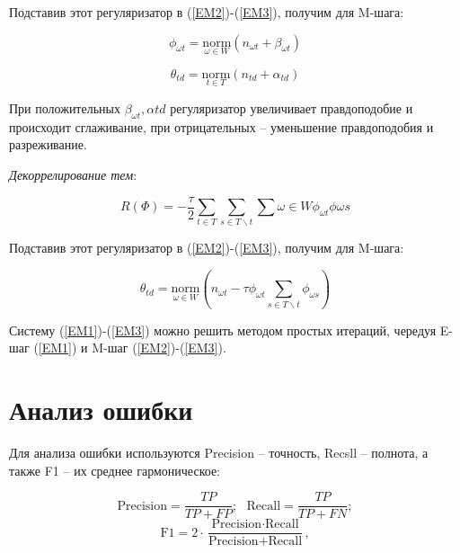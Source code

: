 \documentclass[a4paper, 12pt]{article}
\begin{document}
    Подставив этот регуляризатор в (\ref{EM2})-(\ref{EM3}), получим для M-шага:

    \begin{equation}
        \phi_{\omega t} = \underset{\omega \in W}{\text{norm}}(n_{\omega t} + \beta_{\omega t})
    \end{equation}

    \begin{equation}
        \theta_{td} = \underset{t \in T}{\text{norm}}(n_{td} + \alpha_{td})
    \end{equation}

    При положительных $\beta_{\omega t}, \alpha{td}$ регуляризатор увеличивает правдоподобие и происходит сглаживание, при отрицательных -- уменьшение правдоподобия и разреживание.

    \textit{Декоррелирование тем}:

    \begin{equation}
        R(\Phi) = -\frac{\tau}{2}\sum\limits_{t \in T}\sum\limits_{s \in T\backslash t}\sum\limits{\omega \in W}\phi_{\omega t}\phi{\omega s}
    \end{equation}

    Подставив этот регуляризатор в (\ref{EM2})-(\ref{EM3}), получим для M-шага:

    \begin{equation}
        \theta_{td} = \underset{\omega \in W}{\text{norm}}(n_{\omega t} - \tau \phi_{\omega t} \sum\limits_{s \in T\backslash t}\phi_{\omega s})
    \end{equation}

    Систему (\ref{EM1})-(\ref{EM3}) можно решить методом простых итераций, чередуя E-шаг (\ref{EM1}) и M-шаг (\ref{EM2})-(\ref{EM3}).

\section{Анализ ошибки}
    Для анализа ошибки используются Precision -- точность, Recsll -- полнота, а также F1 -- их среднее гармоническое:

    \begin{equation}
        \text{Precision} = \frac{TP}{TP + FP}; ~~~ \text{Recall} = \frac{TP}{TP + FN};
    \end{equation}
    \begin{equation}
        \text{F1} = 2 \cdot \frac{\text{Precision} \cdot \text{Recall}}{\text{Precision} + \text{Recall}},
    \end{equation}
\end{document}
